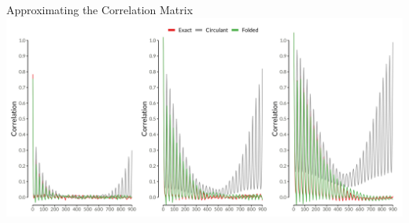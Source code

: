 \documentclass[
  ignorenonframetext,
]{beamer}
\begin{document}
\begin{frame}{Approximating the Correlation Matrix}
\label{approximating-the-correlation-matrix}
\includegraphics{images/cors.png}
\end{frame}
\end{document}
